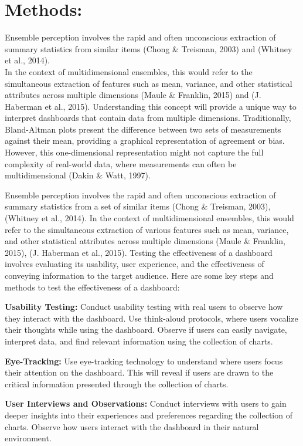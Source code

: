 \documentclass[print]{nuthesis}
\begin{document}
\hypertarget{methods}{%
\section{Methods:}\label{methods}}

Ensemble perception involves the rapid and often unconscious extraction of summary statistics from similar items (Chong \& Treisman, 2003) and (Whitney et al., 2014).\\
In the context of multidimensional ensembles, this would refer to the simultaneous extraction of features such as mean, variance, and other statistical attributes across multiple dimensions (Maule \& Franklin, 2015) and (J. Haberman et al., 2015).
Understanding this concept will provide a unique way to interpret dashboards that contain data from multiple dimensions.
Traditionally, Bland-Altman plots present the difference between two sets of measurements against their mean, providing a graphical representation of agreement or bias.
However, this one-dimensional representation might not capture the full complexity of real-world data, where measurements can often be multidimensional (Dakin \& Watt, 1997).

Ensemble perception involves the rapid and often unconscious extraction of summary statistics from a set of similar items (Chong \& Treisman, 2003), (Whitney et al., 2014).
In the context of multidimensional ensembles, this would refer to the simultaneous extraction of various features such as mean, variance, and other statistical attributes across multiple dimensions (Maule \& Franklin, 2015), (J. Haberman et al., 2015).
Testing the effectiveness of a dashboard involves evaluating its usability, user experience, and the effectiveness of conveying information to the target audience.
Here are some key steps and methods to test the effectiveness of a dashboard:

\textbf{Usability Testing:}
Conduct usability testing with real users to observe how they interact with the dashboard.
Use think-aloud protocols, where users vocalize their thoughts while using the dashboard.
Observe if users can easily navigate, interpret data, and find relevant information using the collection of charts.

\textbf{Eye-Tracking:}
Use eye-tracking technology to understand where users focus their attention on the dashboard.
This will reveal if users are drawn to the critical information presented through the collection of charts.

\textbf{User Interviews and Observations:}
Conduct interviews with users to gain deeper insights into their experiences and preferences regarding the collection of charts.
Observe how users interact with the dashboard in their natural environment.
\end{document}
